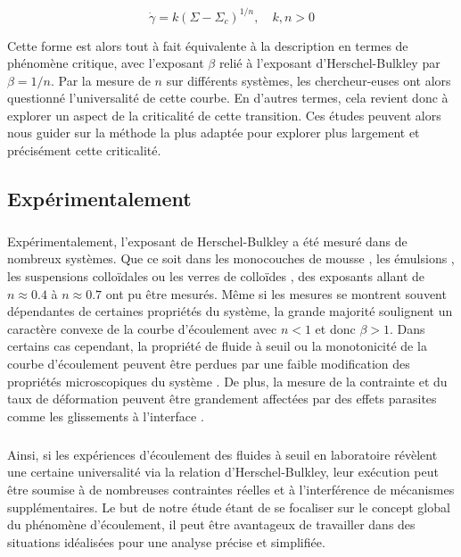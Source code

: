 \begin{equation}
	\dot{\gamma} = k(\Sigma-\Sigma_c)^{1/n},\quad k,n > 0
\end{equation}

\noindent Cette forme est alors tout à fait équivalente à la description en termes de phénomène critique, avec l'exposant $\beta$ relié à l'exposant d'Herschel-Bulkley par $\beta = 1/n$. Par la mesure de $n$ sur différents systèmes, les chercheur-euses ont alors questionné l'universalité de cette courbe. En d'autres termes, cela revient donc à explorer un aspect de la criticalité de cette transition. Ces études peuvent alors nous guider sur la méthode la plus adaptée pour explorer plus largement et précisément cette criticalité.


\subsection{Expérimentalement}

\subparagraph{}Expérimentalement, l'exposant de Herschel-Bulkley a été mesuré dans de nombreux systèmes. Que ce soit dans les monocouches de mousse \cite{katgert_flow_2009}, les émulsions \cite{becu_yielding_2006, jop_microscale_2012}, les suspensions colloïdales \cite{ovarlez_rheopexy_2013} ou les verres de colloïdes \cite{besseling_three_dimensional_2007}, des exposants allant de $n\approx 0.4$ à $n\approx 0.7$ ont pu être mesurés. Même si les mesures se montrent souvent dépendantes de certaines propriétés du système, la grande majorité soulignent un caractère convexe de la courbe d'écoulement avec $n<1$ et donc $\beta>1$. Dans certains cas cependant, la propriété de fluide à seuil ou la monotonicité de la courbe d’écoulement peuvent être perdues par une faible modification des propriétés microscopiques du système \cite{becu_yielding_2006}. De plus, la mesure de la contrainte et du taux de déformation peuvent être grandement affectées par des effets parasites comme les glissements à l'interface \cite{bonn_yield_2017}.

\subparagraph{}Ainsi, si les expériences d'écoulement des fluides à seuil en laboratoire révèlent une certaine universalité via la relation d'Herschel-Bulkley, leur exécution peut être soumise à de nombreuses contraintes réelles et à l'interférence de mécanismes supplémentaires. Le but de notre étude étant de se focaliser sur le concept global du phénomène d’écoulement, il peut être avantageux de travailler dans des situations idéalisées pour une analyse précise et simplifiée.


